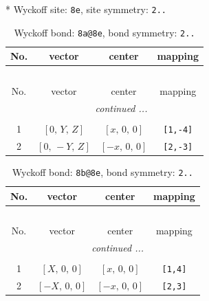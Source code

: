 \documentclass[fleqn,8pt]{jsarticle}
\begin{document}
* Wyckoff site: {\tt 8e}, site symmetry: {\tt 2..}
\renewcommand{\arraystretch}{1.2}
\begin{longtable}{cccc}
\caption{Wyckoff bond: {\tt 8a@8e}, bond symmetry: {\tt 2..}}
 \\
 \hline \hline
No. & vector & center & mapping \\ \hline \endfirsthead

\multicolumn{3}{l}{\tablename\ \thetable{}} \\
 \hline \hline
No. & vector & center & mapping \\ \hline \endhead

 \hline \hline
\multicolumn{3}{r}{\footnotesize\it continued ...} \\ \endfoot

 \hline \hline
\multicolumn{3}{r}{} \\ \endlastfoot

1 & $\left[ 0,\, Y,\, Z \right]$ & $\left[ x,\, 0,\, 0 \right]$ & {\tt [1,-4]} \\ \hline
2 & $\left[ 0,\, - Y,\, Z \right]$ & $\left[ - x,\, 0,\, 0 \right]$ & {\tt [2,-3]} \\
\end{longtable}
\renewcommand{\arraystretch}{1.2}
\begin{longtable}{cccc}
\caption{Wyckoff bond: {\tt 8b@8e}, bond symmetry: {\tt 2..}}
 \\
 \hline \hline
No. & vector & center & mapping \\ \hline \endfirsthead

\multicolumn{3}{l}{\tablename\ \thetable{}} \\
 \hline \hline
No. & vector & center & mapping \\ \hline \endhead

 \hline \hline
\multicolumn{3}{r}{\footnotesize\it continued ...} \\ \endfoot

 \hline \hline
\multicolumn{3}{r}{} \\ \endlastfoot

1 & $\left[ X,\, 0,\, 0 \right]$ & $\left[ x,\, 0,\, 0 \right]$ & {\tt [1,4]} \\ \hline
2 & $\left[ - X,\, 0,\, 0 \right]$ & $\left[ - x,\, 0,\, 0 \right]$ & {\tt [2,3]} \\
\end{longtable}
\renewcommand{\arraystretch}{1.2}
\end{document}
